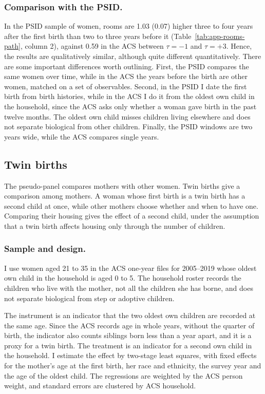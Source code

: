 \subsubsection*{Comparison with the PSID.}
In the PSID sample of women, rooms are 1.03 (0.07) higher three to four
years after the first birth than two to three years before it
(Table~\ref{tab:app-rooms-path}, column 2), against 0.59 in the ACS between
$\tau=-1$ and $\tau=+3$. Hence, the results are qualitatively similar,
although quite different quantitatively. There are some important
differences worth outlining. First, the PSID compares the same women over
time, while in the ACS the years before the birth are other women, matched on
a set of observables. Second, in the PSID I date the first birth from birth
histories, while in the ACS I do it from the oldest own child in the
household, since the ACS asks only whether a woman gave birth in the past
twelve months. The oldest own child misses children living elsewhere and does
not separate biological from other children. Finally, the PSID windows are
two years wide, while the ACS compares single years.

\subsection{Twin births}
\label{app:twins}

The pseudo-panel compares mothers with other women. Twin births give a
comparison among mothers. A woman whose first birth is a twin birth has a
second child at once, while other mothers choose whether and when to have
one. Comparing their housing gives the effect of a second child, under the
assumption that a twin birth affects housing only through the number of
children.

\subsubsection*{Sample and design.}
I use women aged 21 to 35 in the ACS one-year files for 2005--2019 whose
oldest own child in the household is aged 0 to 5. The household roster records the children who
live with the mother, not all the children she has borne, and does not
separate biological from step or adoptive children.

The instrument is an indicator that the two oldest own children are recorded
at the same age. Since the ACS records age in whole years, without the
quarter of birth, the indicator also counts siblings born less than a year
apart, and it is a proxy for a twin birth. The treatment is an indicator for
a second own child in the household. I estimate the effect by two-stage least
squares, with fixed effects for the mother's age at the first birth, her race
and ethnicity, the survey year and the age of the oldest child. The
regressions are weighted by the ACS person weight, and standard errors are
clustered by ACS household.

